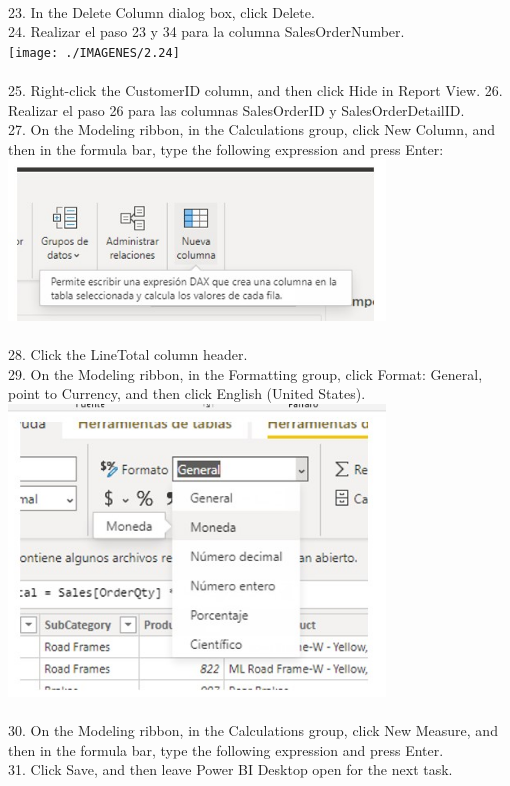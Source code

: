 \documentclass[preprint,12pt]{elsarticle}
\begin{document}
\begin{itemize}
		 		\\ 23. In the Delete Column dialog box, click Delete.
		 		\\ 24. Realizar el paso 23 y 34 para la columna SalesOrderNumber.
		 		\\ \texttt{[image: ./IMAGENES/2.24]} \\
		 		\\ 25. Right-click the CustomerID column, and then click Hide in Report View.
		 		26. Realizar el paso 26 para las columnas SalesOrderID y SalesOrderDetailID.
		 		\\ 27. On the Modeling ribbon, in the Calculations group, click New Column, and then in the formula bar, type the
		 		following expression and press Enter:
		 		\\ \includegraphics[width=10cm]{./IMAGENES/2.27} \\
		 		\\ 28. Click the LineTotal column header.
		 		\\ 29. On the Modeling ribbon, in the Formatting group, click Format: General, point to Currency, and then click 
		 		English (United States).
		 		\\ \includegraphics[width=10cm]{./IMAGENES/2.29} \\
		 		\\ 30. On the Modeling ribbon, in the Calculations group, click New Measure, and then in the formula bar, type the
		 		following expression and press Enter.
		 		\\ 31. Click Save, and then leave Power BI Desktop open for the next task.
		 		

\end{itemize}
\end{document}
